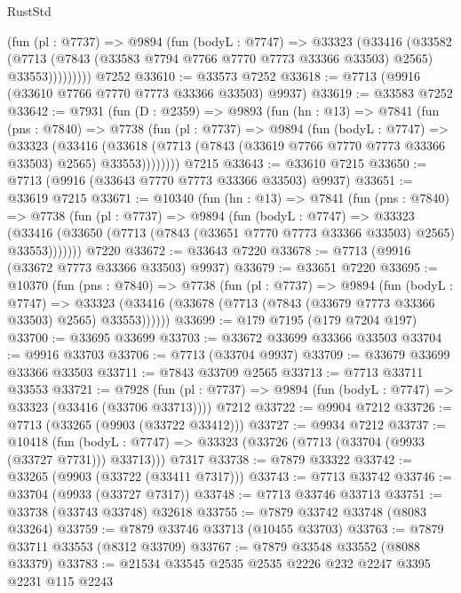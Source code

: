 \begin{lexlean}{RustStd}
\begin{coremodule}
            (fun (pl : @7737) =>
            @9894
              (fun (bodyL : @7747) =>
              @33323
                (@33416
                  (@33582
                    (@7713
                      (@7843 (@33583 @7794 @7766 @7770 @7773 @33366 @33503) @2565)
                      @33553)))))))))
    @7252
@33610 := @33573 @7252
@33618 := @7713 (@9916 (@33610 @7766 @7770 @7773 @33366 @33503) @9937)
@33619 := @33583 @7252
@33642 := @7931
    (fun (D : @2359) =>
    @9893
      (fun (hn : @13) =>
      @7841
        (fun (pns : @7840) =>
        @7738
          (fun (pl : @7737) =>
          @9894
            (fun (bodyL : @7747) =>
            @33323
              (@33416
                (@33618 (@7713 (@7843 (@33619 @7766 @7770 @7773 @33366 @33503) @2565) @33553))))))))
    @7215
@33643 := @33610 @7215
@33650 := @7713 (@9916 (@33643 @7770 @7773 @33366 @33503) @9937)
@33651 := @33619 @7215
@33671 := @10340
    (fun (hn : @13) =>
    @7841
      (fun (pns : @7840) =>
      @7738
        (fun (pl : @7737) =>
        @9894
          (fun (bodyL : @7747) =>
          @33323
            (@33416 (@33650 (@7713 (@7843 (@33651 @7770 @7773 @33366 @33503) @2565) @33553)))))))
    @7220
@33672 := @33643 @7220
@33678 := @7713 (@9916 (@33672 @7773 @33366 @33503) @9937)
@33679 := @33651 @7220
@33695 := @10370
    (fun (pns : @7840) =>
    @7738
      (fun (pl : @7737) =>
      @9894
        (fun (bodyL : @7747) =>
        @33323 (@33416 (@33678 (@7713 (@7843 (@33679 @7773 @33366 @33503) @2565) @33553))))))
@33699 := @179 @7195 (@179 @7204 @197)
@33700 := @33695 @33699
@33703 := @33672 @33699 @33366 @33503
@33704 := @9916 @33703
@33706 := @7713 (@33704 @9937)
@33709 := @33679 @33699 @33366 @33503
@33711 := @7843 @33709 @2565
@33713 := @7713 @33711 @33553
@33721 := @7928
    (fun (pl : @7737) => @9894 (fun (bodyL : @7747) => @33323 (@33416 (@33706 @33713))))
    @7212
@33722 := @9904 @7212
@33726 := @7713 (@33265 (@9903 (@33722 @33412)))
@33727 := @9934 @7212
@33737 := @10418
    (fun (bodyL : @7747) => @33323 (@33726 (@7713 (@33704 (@9933 (@33727 @7731))) @33713)))
    @7317
@33738 := @7879 @33322
@33742 := @33265 (@9903 (@33722 (@33411 @7317)))
@33743 := @7713 @33742
@33746 := @33704 (@9933 (@33727 @7317))
@33748 := @7713 @33746 @33713
@33751 := @33738 (@33743 @33748) @32618
@33755 := @7879 @33742 @33748 (@8083 @33264)
@33759 := @7879 @33746 @33713 (@10455 @33703)
@33763 := @7879 @33711 @33553 (@8312 @33709)
@33767 := @7879 @33548 @33552 (@8088 @33379)
@33783 := @21534
    @33545
    @2535
    @2535
    @2226
    @232
    @2247
    @3395
    @2231
    @115
    @2243

\end{coremodule}
\end{lexlean}

